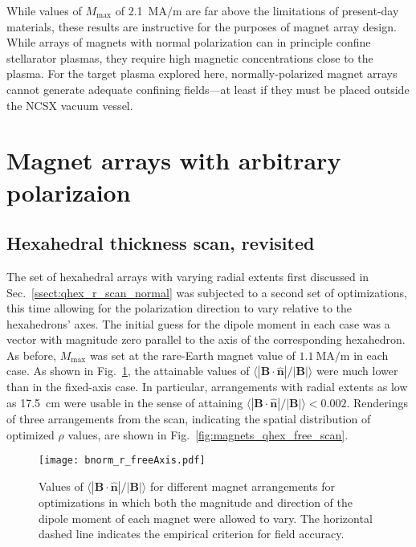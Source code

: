 \documentclass[11pt,onecolumn]{article}
\newcommand{\relbnorm}{\langle|\mathbf{B}\cdot\hat{\mathbf{n}}|
                       /|\mathbf{B}|\rangle}
\begin{document}
While values of $M_\text{max}$ of 2.1~$\text{MA}/\text{m}$ are far above the
limitations of present-day materials, these results are instructive for the
purposes of magnet array design. While arrays of magnets with normal 
polarization can in principle confine stellarator plasmas, they require high
magnetic concentrations close to the plasma. For the target plasma explored
here, normally-polarized magnet arrays cannot generate adequate confining
fields---at least if they must be placed outside the NCSX vacuum vessel.

\section{Magnet arrays with arbitrary polarizaion}
\label{sect:free_axis}

\subsection{Hexahedral thickness scan, revisited}
\label{ssect:qhex_r_scan_free}

The set of hexahedral arrays with varying radial extents first discussed in
Sec.~\ref{ssect:qhex_r_scan_normal} was subjected to a second set of 
optimizations, this time allowing for the polarization direction to vary
relative to the hexahedrons' axes. The initial guess for the dipole moment
in each case was a vector with magnitude zero parallel to the axis of the 
corresponding hexahedron. As before, $M_\text{max}$ was set at the
rare-Earth magnet value of $1.1~\text{MA}/\text{m}$ in each case.
As shown in Fig.~\ref{fig:bnorm_r_free}, the attainable values of
$\relbnorm$ were much lower than in the fixed-axis case. In particular, 
arrangements with radial extents as low as 17.5~cm were usable in the sense
of attaining $\relbnorm<0.002$. Renderings of three arrangements from the
scan, indicating the spatial distribution of optimized $\rho$ values,
are shown in Fig.~\ref{fig:magnets_qhex_free_scan}.

\begin{figure}
    \begin{center}
    \texttt{[image: bnorm\_r\_freeAxis.pdf]}
    \caption{Values of $\relbnorm$ for different magnet arrangements for
             optimizations in which both the magnitude and direction of the
             dipole moment of each magnet were allowed to vary. The horizontal
             dashed line indicates the empirical criterion for field accuracy.}
    \label{fig:bnorm_r_free}
    \end{center}
\end{figure}
\end{document}
